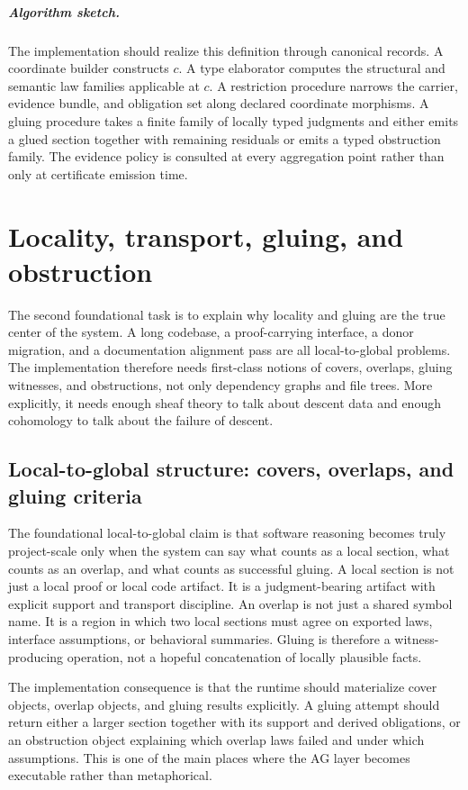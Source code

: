 \documentclass[11pt]{report}
\begin{document}
\paragraph{Algorithm sketch.}
The implementation should realize this definition through canonical records. A coordinate builder constructs $c$. A type elaborator computes the structural and semantic law families applicable at $c$. A restriction procedure narrows the carrier, evidence bundle, and obligation set along declared coordinate morphisms. A gluing procedure takes a finite family of locally typed judgments and either emits a glued section together with remaining residuals or emits a typed obstruction family. The evidence policy is consulted at every aggregation point rather than only at certificate emission time.
\chapter{Locality, transport, gluing, and obstruction}
The second foundational task is to explain why locality and gluing are the true center of the system. A long codebase, a proof-carrying interface, a donor migration, and a documentation alignment pass are all local-to-global problems. The implementation therefore needs first-class notions of covers, overlaps, gluing witnesses, and obstructions, not only dependency graphs and file trees. More explicitly, it needs enough sheaf theory to talk about descent data and enough cohomology to talk about the failure of descent.
\section{Local-to-global structure: covers, overlaps, and gluing criteria}
The foundational local-to-global claim is that software reasoning becomes truly project-scale only when the system can say what counts as a local section, what counts as an overlap, and what counts as successful gluing. A local section is not just a local proof or local code artifact. It is a judgment-bearing artifact with explicit support and transport discipline. An overlap is not just a shared symbol name. It is a region in which two local sections must agree on exported laws, interface assumptions, or behavioral summaries. Gluing is therefore a witness-producing operation, not a hopeful concatenation of locally plausible facts.

The implementation consequence is that the runtime should materialize cover objects, overlap objects, and gluing results explicitly. A gluing attempt should return either a larger section together with its support and derived obligations, or an obstruction object explaining which overlap laws failed and under which assumptions. This is one of the main places where the AG layer becomes executable rather than metaphorical.
\end{document}
